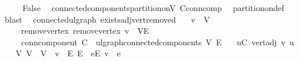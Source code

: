 \begin{isabellebody}
\ \ \isamarkupfalse%
\ \isamarkupfalse%
\ False\ \isamarkupfalse%
\ connected{\isacharunderscore}{\kern0pt}components{\isacharunderscore}{\kern0pt}partition{\isacharunderscore}{\kern0pt}on{\isacharunderscore}{\kern0pt}V\ C{\isacharunderscore}{\kern0pt}conn{\isacharunderscore}{\kern0pt}comp\ \isamarkupfalse%
\ partition{\isacharunderscore}{\kern0pt}on{\isacharunderscore}{\kern0pt}def\ \isamarkupfalse%
\ blast\isanewline
{}\isamarkupfalse%
%
\endisatagproof
{\isafoldproof}%
%
\isadelimproof
\isanewline
%
\endisadelimproof
\isanewline
{}\isamarkupfalse%
\ {\isacharparenleft}{\kern0pt}\ connected{\isacharunderscore}{\kern0pt}ulgraph{\isacharparenright}{\kern0pt}\ exists{\isacharunderscore}{\kern0pt}adj{\isacharunderscore}{\kern0pt}vert{\isacharunderscore}{\kern0pt}removed{\isacharcolon}{\kern0pt}\isanewline
\ \ \ {\isachardoublequoteopen}v\ {\isasymin}\ V{\isachardoublequoteclose}\isanewline
\ \ \ \ \ remove{\isacharunderscore}{\kern0pt}vertex{\isacharcolon}{\kern0pt}\ {\isachardoublequoteopen}remove{\isacharunderscore}{\kern0pt}vertex\ v\ {\isacharequal}{\kern0pt}\ {\isacharparenleft}{\kern0pt}V{\isacharprime}{\kern0pt}{\isacharcomma}{\kern0pt}E{\isacharprime}{\kern0pt}{\isacharparenright}{\kern0pt}{\isachardoublequoteclose}\isanewline
\ \ \ \ \ conn{\isacharunderscore}{\kern0pt}component{\isacharcolon}{\kern0pt}\ {\isachardoublequoteopen}C\ {\isasymin}\ ulgraph{\isachardot}{\kern0pt}connected{\isacharunderscore}{\kern0pt}components\ V{\isacharprime}{\kern0pt}\ E{\isacharprime}{\kern0pt}{\isachardoublequoteclose}\isanewline
\ \ \ {\isachardoublequoteopen}{\isasymexists}u{\isasymin}C{\isachardot}{\kern0pt}\ vert{\isacharunderscore}{\kern0pt}adj\ v\ u{\isachardoublequoteclose}\isanewline
%
\isadelimproof
%
\endisadelimproof
%
\isatagproof
{}\isamarkupfalse%
{\isacharminus}{\kern0pt}\isanewline
\ \ \isamarkupfalse%
\ V{\isacharprime}{\kern0pt}{\isacharcolon}{\kern0pt}\ {\isachardoublequoteopen}V{\isacharprime}{\kern0pt}\ {\isacharequal}{\kern0pt}\ V\ {\isacharminus}{\kern0pt}\ {\isacharbraceleft}{\kern0pt}v{\isacharbraceright}{\kern0pt}{\isachardoublequoteclose}\ \ E{\isacharprime}{\kern0pt}{\isacharcolon}{\kern0pt}\ {\isachardoublequoteopen}E{\isacharprime}{\kern0pt}\ {\isacharequal}{\kern0pt}\ {\isacharbraceleft}{\kern0pt}e{\isasymin}E{\isachardot}{\kern0pt}\ v\ {\isasymnotin}\ e{\isacharbraceright}{\kern0pt}{\isachardoublequoteclose}\ \isamarkupfalse%

\end{isabellebody}
